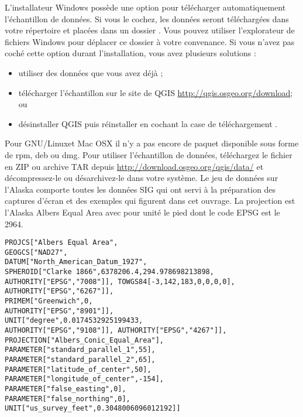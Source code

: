 \win L'installateur Windows poss\`ede une option pour t\'el\'echarger automatiquement l'\'echantillon de donn\'ees. Si vous le cochez, les donn\'ees seront t\'el\'echarg\'ees dans votre r\'epertoire  et plac\'ees dans un dossier . Vous pouvez utiliser l'explorateur de fichiers Windows pour d\'eplacer ce dossier \`a votre convenance. Si vous n'avez pas coch\'e cette option durant l'installation, vous avez plusieurs solutions : 
\begin{itemize} 
\item utiliser des donn\'ees que vous avez d\'ej\`a ;
\item t\'el\'echarger l'\'echantillon sur le site de QGIS \url{http://qgis.osgeo.org/download}; ou 
\item d\'esinstaller QGIS puis r\'einstaller en cochant la case de t\'el\'echargement .
\end{itemize}

\nix \osx Pour GNU/Linuxet Mac OSX il n'y a pas encore de paquet disponible sous forme de rpm, deb ou dmg. Pour utiliser l'\'echantillon de donn\'ees, t\'el\'echargez le fichier  en ZIP ou archive TAR depuis \url{http://download.osgeo.org/qgis/data/} et d\'ecompressez-le ou d\'esarchivez-le dans votre syst\`eme. Le jeu de donn\'ees sur l'Alaska comporte toutes les donn\'ees SIG qui ont servi \`a la pr\'eparation des captures d'\'ecran et des exemples qui figurent dans cet ouvrage. La projection est l'Alaska Albers Equal Area avec pour unit\'e le pied dont le code EPSG est le 2964.

\begin{verbatim}
PROJCS["Albers Equal Area",  
GEOGCS["NAD27",  
DATUM["North_American_Datum_1927",  
SPHEROID["Clarke 1866",6378206.4,294.978698213898,  
AUTHORITY["EPSG","7008"]], TOWGS84[-3,142,183,0,0,0,0], AUTHORITY["EPSG","6267"]],   
PRIMEM["Greenwich",0,   
AUTHORITY["EPSG","8901"]],   
UNIT["degree",0.0174532925199433,   
AUTHORITY["EPSG","9108"]], AUTHORITY["EPSG","4267"]],   
PROJECTION["Albers_Conic_Equal_Area"],   
PARAMETER["standard_parallel_1",55],   
PARAMETER["standard_parallel_2",65],   
PARAMETER["latitude_of_center",50],   
PARAMETER["longitude_of_center",-154],   
PARAMETER["false_easting",0],   
PARAMETER["false_northing",0],   
UNIT["us_survey_feet",0.3048006096012192]] \end{verbatim}


